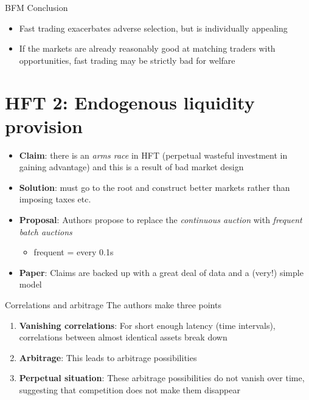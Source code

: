 \documentclass[english,10pt
,aspectratio=169
]{beamer}
\begin{document}
\begin{frame}{BFM Conclusion}
	\begin{itemize}
		\item Fast trading exacerbates adverse selection, but is individually appealing
		\item If the markets are already reasonably good at matching traders with opportunities, fast trading may be strictly bad for welfare
	\end{itemize}
\end{frame}


\section{HFT 2: Endogenous liquidity provision}

\begin{frame}{\citet*{budish_high-frequency_2015}}
	\begin{itemize}
		\item \textbf{Claim}: there is an \textit{arms race} in HFT (perpetual wasteful investment in gaining advantage) and this is a result of bad market design
		\item \textbf{Solution}: must go to the root and construct better markets rather than imposing taxes etc.
		\item \textbf{Proposal}: Authors propose to replace the \textit{continuous auction} with \textit{frequent batch auctions}
		\begin{itemize}
			\item frequent = every 0.1s
		\end{itemize}
		\item \textbf{Paper}: Claims are backed up with a great deal of data and a (very!) simple model
	\end{itemize}
\end{frame}


\begin{frame}{Correlations and arbitrage}
	The authors make three points
	\begin{enumerate}
		\item \textbf{Vanishing correlations}: For short enough latency (time intervals), correlations between almost identical assets break down
		\item \textbf{Arbitrage}: This leads to arbitrage possibilities
		\item \textbf{Perpetual situation}: These arbitrage possibilities do not vanish over time, suggesting that competition does not make them disappear
	\end{enumerate}
\end{frame}
\end{document}
